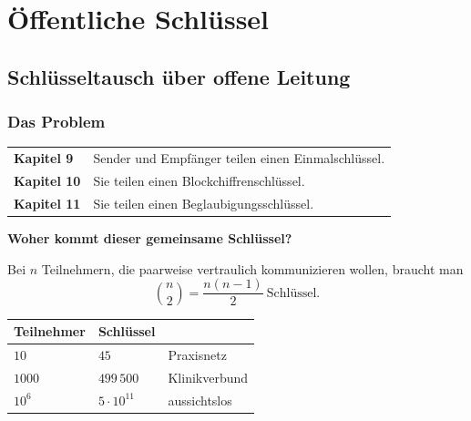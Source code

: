 \part{Öffentliche Schlüssel}

\chapter{Schlüsseltausch über offene Leitung}

\section{Das Problem}

\begin{merksatz}
\begin{center}
{\small
\renewcommand{\arraystretch}{1.5}
\begin{tabular}{@{}P{2.4cm}P{6.2cm}@{}}
\toprule
\textbf{Kapitel 9} & Sender und Empfänger teilen einen Einmalschlüssel.\\
\textbf{Kapitel 10} & Sie teilen einen Blockchiffrenschlüssel.\\
\textbf{Kapitel 11} & Sie teilen einen Beglaubigungsschlüssel.\\
\bottomrule
\end{tabular}}
\end{center}

\begin{center}
\begin{minipage}{0.9\textwidth}
\textbf{Woher kommt dieser gemeinsame Schlüssel?}
\end{minipage}
\end{center}

Bei $n$ Teilnehmern, die paarweise vertraulich kommunizieren wollen, braucht man
\[ \binom{n}{2} = \frac{n(n-1)}{2} \ \text{Schlüssel.} \]

\begin{center}
{\small
\renewcommand{\arraystretch}{1.48}
\begin{tabular}{@{}P{2.4cm}P{2.4cm}P{2.6cm}@{}}
\toprule
\textbf{Teilnehmer} & \textbf{Schlüssel} & \\
\midrule
$10$ & $45$ & Praxisnetz\\
$1000$ & $499\,500$ & Klinikverbund\\
$10^{6}$ & $5\cdot10^{11}$ & \textcolor{akzent}{aussichtslos}\\
\bottomrule
\end{tabular}}
\end{center}

\begin{center}
\begin{minipage}{0.88\textwidth}
\end{minipage}
\end{center}
\end{merksatz}

